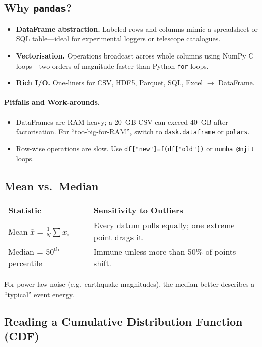 \documentclass[a4paper,11pt]{article}
\begin{document}
\subsection{Why \texttt{pandas}?}
\begin{itemize}
  \item \textbf{DataFrame abstraction.} Labeled rows and columns mimic a spreadsheet or SQL table—ideal for experimental loggers or telescope catalogues.
  \item \textbf{Vectorisation.} Operations broadcast across whole columns using NumPy C loops—two orders of magnitude faster than Python \texttt{for} loops.
  \item \textbf{Rich I/O.} One-liners for CSV, HDF5, Parquet, SQL, Excel $\to$ DataFrame.
\end{itemize}

\paragraph{Pitfalls and Work-arounds.}
\begin{itemize}
  \item DataFrames are RAM-heavy; a \SI{20}{GB} CSV can exceed \SI{40}{GB} after factorisation.  For “too-big-for-RAM”, switch to \texttt{dask.dataframe} or \texttt{polars}.
  \item Row-wise operations are slow.  Use \lstinline|df["new"]=f(df["old"])| or \texttt{numba @njit} loops.
\end{itemize}

\subsection{Mean vs.\ Median}
\begin{tabularx}{\linewidth}{@{}lX@{}}
\toprule
\textbf{Statistic} & \textbf{Sensitivity to Outliers}\\
\midrule
Mean $\displaystyle\overline{x}=\frac1N\sum x_i$         & Every datum pulls equally; one extreme point drags it.\\
Median = $50^{\text{th}}$ percentile & Immune unless more than $50\%$ of points shift.\\
\bottomrule
\end{tabularx}
\medskip

For power-law noise (e.g.\ earthquake magnitudes), the median better describes a “typical” event energy.

\subsection{Reading a Cumulative Distribution Function (CDF)}
\end{document}
